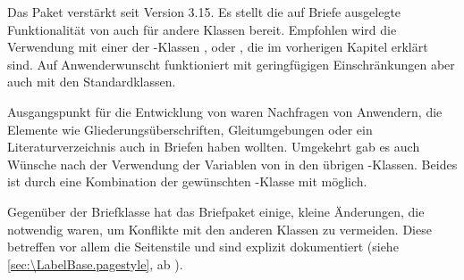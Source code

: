 \iffalse%
Die Klasse \Class{scrlttr2}\important{\Class{scrlttr2}} wurde 2002 von Grund
auf neu entwickelt. Sie hat daher auch ein komplett anderes Bedienkonzept als
alle übrigen mir bekannten Klassen. Die neue Art der Bedienung ist
möglicherweise etwas ungewohnt, bietet jedoch nicht nur dem geübten Anwender
einige Vorteile.%
\fi%

Das Paket %
 verstärkt \KOMAScript{} seit Version
3.15. Es stellt die auf Briefe ausgelegte Funktionalität von 
auch für andere Klassen bereit. Empfohlen wird die Verwendung mit einer der
\KOMAScript-Klassen ,  oder ,
die im vorherigen Kapitel erklärt sind. %
\iffalse %
Mit geringfügigen Einschränkungen funktioniert \Package{scrletter}%
\else %
Auf Anwenderwunscht funktioniert  mit geringfügigen
Einschränkungen %
\fi %
aber auch mit den Standardklassen.

Ausgangspunkt für die Entwicklung von  waren
Nachfragen von Anwendern, die Elemente wie
Gliederungsüberschriften, Gleitumgebungen oder ein Literaturverzeichnis auch in Briefen
haben wollten. Umgekehrt gab es auch Wünsche nach der Verwendung der Variablen
von  in den übrigen \KOMAScript-Klassen. Beides ist durch eine
Kombination der gewünschten \KOMAScript-Klasse mit 
möglich.

Gegenüber der Briefklasse hat das Briefpaket einige, kleine Änderungen, die
notwendig waren, um Konflikte mit den anderen Klassen zu vermeiden. Diese
betreffen vor allem die Seitenstile und sind explizit dokumentiert (siehe
\autoref{sec:\LabelBase.pagestyle}, ab
). %
\iffalse %
Wo \Package{scrletter} nicht explizit erwähnt ist, gilt dafür alles, was für
\Class{scrlttr2} dokumentiert ist, ohne Änderung. %
\fi%



